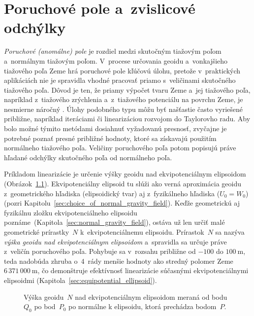 \documentclass[a4paper, 12pt]{book}
\begin{document}

\chapter{Poruchové pole a~zvislicové odchýlky}
\label{sec:disturbing_field_deflections}

\emph{Poruchové (anomálne) pole} je rozdiel medzi skutočným tiažovým poľom 
a~normálnym tiažovým poľom.  V~procese určovania geoidu a~vonkajšieho tiažového 
poľa Zeme hrá poruchové pole kľúčovú úlohu, pretože v~praktických aplikáciách 
nie je spravidla vhodné pracovať priamo s~veličinami skutočného tiažového poľa.  
Dôvod je ten, že priamy výpočet tvaru Zeme a~jej tiažového poľa, napríklad 
z~tiažového zrýchlenia a~z~tiažového potenciálu na povrchu Zeme, je nesmierne 
náročný \parencite[pozri 
napríklad][]{Hormander1976,SansoGeodeticBoundaryValueProblem}.  Úlohy podobného 
typu môžu byť našťastie často vyriešené približne, napríklad iteráciami či 
linearizáciou rozvojom do Taylorovho radu.  Aby bolo možné týmito metódami 
dosiahnuť vyžadovanú presnosť, zvyčajne je potrebné poznať presné približné 
hodnoty, ktoré sa získavajú použitím normálneho tiažového poľa.  Veličiny 
poruchového poľa potom popisujú práve hľadané odchýlky skutočného poľa od 
normálneho poľa.

Príkladom linearizácie je určenie výšky geoidu nad ekvipotenciálnym elipsoidom 
(Obrázok~\ref{fig:geoid}).  Ekvipotenciálny elipsoid tu slúži ako verná 
aproximácia geoidu z~geometrického hľadiska (elipsoidický tvar) aj 
z~fyzikálneho hľadiska ($U_0 = W_0$) (pozri 
Kapitolu~\ref{sec:choice_of_normal_gravity_field}).  Keďže geometrickú aj 
fyzikálnu zložku ekvipotenciálneho elipsoidu 
poznáme~(Kapitola~\ref{sec:normal_gravity_field}), ostáva už len určiť malé 
geometrické prírastky~$N$ k~ekvipotenciálnemu elipsoidu.  Prírastok~$N$ sa 
nazýva \emph{výška geoidu nad ekvipotenciálnym elipsoidom} a~spravidla sa 
určuje práve z~veličín poruchového poľa.  Pohybuje sa v~rozsahu približne od 
$-100$ do $100\ \mathrm{m}$, teda nadobúda zhruba o~4~rády menšie hodnoty ako 
stredný polomer Zeme~$6\, 371 \, 000\ \mathrm{m}$, čo demonštruje efektívnosť 
linearizácie súčasnými ekvipotenciálnymi elipsoidmi 
(Kapitola~\ref{sec:equipotential_ellipsoid}).

\begin{figure}[bt]
\centering

\caption{Výška geoidu~$N$ nad ekvipotenciálnym elipsoidom meraná od bodu~$Q_0$ 
po bod~$P_0$ po normálne k elipsoidu, ktorá prechádza bodom~$P$.}
\label{fig:geoid}
\end{figure}
\end{document}
